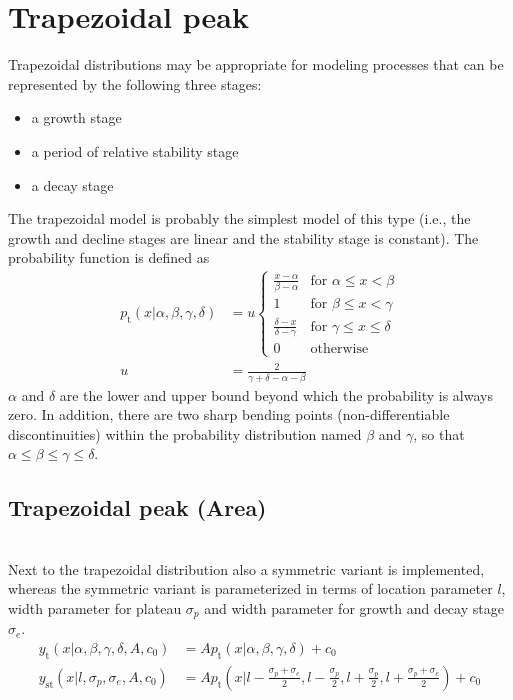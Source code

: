 \clearpage
\section{Trapezoidal peak}
\label{sec:trapezoidal}

Trapezoidal distributions may be appropriate for modeling processes that can be represented by the following three stages:
\begin{itemize}
\item a growth stage
\item a period of relative stability stage
\item a decay stage
\end{itemize}
The trapezoidal model is probably the simplest model of this type (i.e., the growth and decline stages are linear and the stability stage is constant). The probability function is defined as
\begin{align}
p_\mathrm{t}(x|\alpha,\beta,\gamma,\delta) &= u
\begin{cases}{\frac {x-\alpha}{\beta-\alpha}}&{\text{for }}\alpha\leq x<\beta\\
             1&{\text{for }}\beta\leq x<\gamma \\
             {\frac {\delta-x}{\delta-\gamma}}&{\text{for }}\gamma\leq x\leq \delta \\
             {0} &{\text{otherwise }}
\end{cases} \\
u &= \frac {2}{\gamma+\delta-\alpha-\beta}
\end{align}
$\alpha$ and $\delta$ are the lower and upper bound beyond which the probability is always zero.
 In addition, there are two sharp bending points (non-differentiable discontinuities) within the probability distribution named $\beta$ and $\gamma$, so that $\alpha\leq\beta\leq\gamma\leq\delta$.

\subsection{Trapezoidal peak (Area)} ~\\
\label{sec:trapezoidalArea}
Next to the trapezoidal distribution also a symmetric variant is implemented, whereas the symmetric variant is parameterized in terms of location parameter $l$, width parameter for plateau $\sigma_p$ and width parameter for growth and decay stage $\sigma_e$.
\begin{align}\label{eq:trapezoidalpeakArea}
y_\mathrm{t}(x|\alpha,\beta,\gamma,\delta,A,c_0) &= A\textstyle p_\mathrm{t}(x|\alpha,\beta,\gamma,\delta) +c_0 \\
y_\mathrm{st}(x|l,\sigma_p,\sigma_e,A,c_0) &= A \textstyle p_\mathrm{t}\left(x|l-\frac{\sigma_p+\sigma_e}{2},l-\frac{\sigma_p}{2},l+\frac{\sigma_p}{2},l+\frac{\sigma_p+\sigma_e}{2}\right) +c_0
\end{align}

